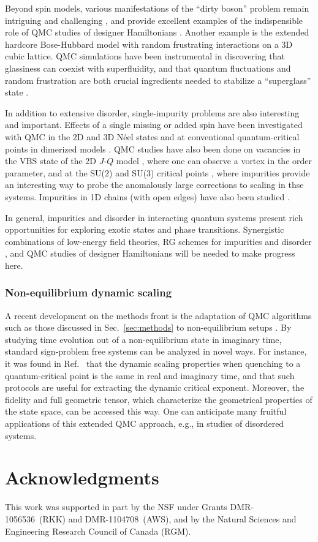 \documentclass[range]{ar2e}
\begin{document}
Beyond spin models, various manifestations of the ``dirty boson'' problem remain intriguing and challenging \cite{Pollet09,Meier12,Iyer12}, and provide excellent 
examples of the indispensible role of QMC studies of designer Hamiltonians \cite{Gurarie09}. Another example is the extended hardcore Bose-Hubbard model with 
random frustrating interactions on a 3D cubic lattice. QMC simulations have been instrumental in discovering that glassiness can coexist with superfluidity, 
and that quantum fluctuations and random frustration are both crucial ingredients needed to stabilize a ``superglass'' state \cite{superglass1,superglass2}.

In addition to extensive disorder, single-impurity problems are also interesting and important. Effects of a single missing or added spin have been
investigated with QMC in the 2D and 3D N\'eel states \cite{Hoglund04} and at conventional quantum-critical points in dimerized models \cite{Hoglund07}. 
QMC studies have also been done on vacancies in the VBS state of the 2D $J$-$Q$ model \cite{Kaul08}, where one can observe a vortex in the order parameter, 
and at the SU($2$) and SU($3$) critical points \cite{banerjee2010:log,banerjee2010:su3}, where impurities provide an interesting way to probe the anomalously 
large corrections to scaling in thse systems. Impurities in 1D chains (with open edges) have also been studied \cite{Sanyal11}.

In general, impurities and disorder in interacting quantum systems present rich opportunities for exploring exotic states and phase transitions.
Synergistic combinations of low-energy field theories, RG schemes for impurities \cite{Vojta12} and disorder \cite{Hoyos08,Vojta10,Altman10,Iyer12}, 
and QMC studies of designer Hamiltonians will be needed to make progress here.

\subsubsection{Non-equilibrium dynamic scaling}

A recent development on the methods front is the adaptation of QMC algorithms such as those discussed in Sec.~\ref{sec:methods} to non-equilibrium 
setups \cite{Degrandi11}. By studying time evolution out of a non-equilibrium state in imaginary time, standard sign-problem free systems
can be analyzed in novel ways. For instance, it was found in Ref.~\cite{Degrandi11} that the dynamic scaling properties when quenching to
a quantum-critical point is the same in real and imaginary time, and that such protocols are useful for extracting the dynamic critical
exponent. Moreover, the fidelity and full geometric tensor, which characterize the geometrical properties of the state space, can be
accessed this way. One can anticipate many fruitful applications of this extended QMC approach, e.g., in studies of disordered systems.

\section*{Acknowledgments}

This work was supported in part by the NSF under Grants DMR-1056536~(RKK) and DMR-1104708~(AWS), and by the Natural Sciences and Engineering Research Council of Canada (RGM).



\end{document}
